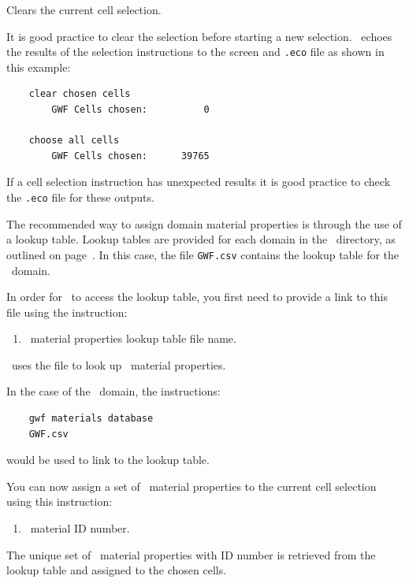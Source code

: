 {
    {Clears the current cell selection.
     }

It is good practice to clear the selection before starting a new selection. \mut\ echoes the results of the selection instructions to the screen and \texttt{.eco} file as shown in this example:
\begin{verbatim}
    clear chosen cells
    	GWF Cells chosen:          0

    choose all cells
    	GWF Cells chosen:      39765
\end{verbatim}
If a cell selection instruction has unexpected results it is good practice to check the \texttt{.eco} file for these outputs.

The recommended way to assign domain material properties is through the use of a lookup table.
\label{page:LookupTable}
\label{page:LookupTable}
Lookup tables are provided for each domain in the \bin\ directory, as outlined on page~\pageref{page:userbin}. In this case, the file \texttt{GWF.csv} contains the lookup table for the \gwf\ domain.

In order for \mut\ to access the lookup table, you first need to provide a link to this file using the instruction:

    {
        \squish
        \begin{enumerate}
        \item {}  \gwf\ material properties lookup table file name.
        \end{enumerate}
          \mut\ uses the file  to look up \gwf\ material properties.
    }

In the case of the \gwf\ domain, the instructions:
\begin{verbatim}
    gwf materials database
    GWF.csv
\end{verbatim}
would be used to link to the lookup table.

You can now assign a set of \gwf\ material properties to the current cell selection using this instruction:

    {
        \squish
        \begin{enumerate}
        \item {}  \gwf\ material ID number.
        \end{enumerate}
          The unique set of \gwf\ material properties with ID number  is retrieved from the lookup table and assigned to the chosen cells.
    }

}
